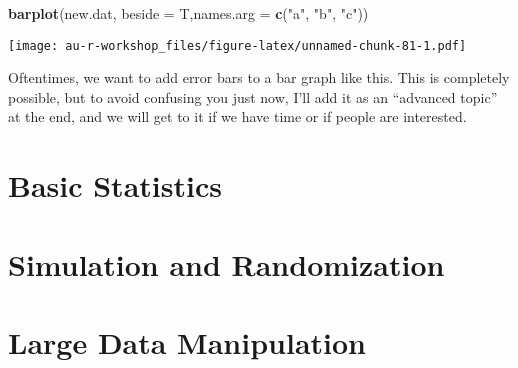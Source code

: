 \documentclass[]{book}
\newenvironment{Shaded}{\begin{snugshade}}{\end{snugshade}}
\newcommand{\KeywordTok}[1]{\textcolor[rgb]{0.13,0.29,0.53}{\textbf{#1}}}
\newcommand{\DataTypeTok}[1]{\textcolor[rgb]{0.13,0.29,0.53}{#1}}
\newcommand{\StringTok}[1]{\textcolor[rgb]{0.31,0.60,0.02}{#1}}
\newcommand{\NormalTok}[1]{#1}
\theoremstyle{definition}
\theoremstyle{definition}
\theoremstyle{definition}
\theoremstyle{remark}
\begin{document}
\begin{Shaded}
\begin{Highlighting}[]
\KeywordTok{barplot}\NormalTok{(new.dat, }\DataTypeTok{beside =}\NormalTok{ T,}\DataTypeTok{names.arg =} \KeywordTok{c}\NormalTok{(}\StringTok{"a"}\NormalTok{, }\StringTok{"b"}\NormalTok{, }\StringTok{"c"}\NormalTok{))}
\end{Highlighting}
\end{Shaded}

\texttt{[image: au-r-workshop\_files/figure-latex/unnamed-chunk-81-1.pdf]}

Oftentimes, we want to add error bars to a bar graph like this. This is
completely possible, but to avoid confusing you just now, I'll add it as
an ``advanced topic'' at the end, and we will get to it if we have time
or if people are interested.

\chapter{Basic Statistics}\label{ch3}

\chapter{Simulation and Randomization}\label{ch4}

\chapter{Large Data Manipulation}\label{ch5}


\end{document}
